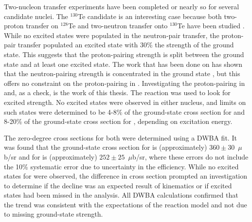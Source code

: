 Two-nucleon transfer experiments have been completed or nearly so for several candidate nuclei.  The $^{130}$Te candidate is an interesting case because both two-proton transfer on $^{128}$Te and two-neutron transfer onto $^{130}$Te have been studied \cite{protonPairsTellurium,neutronPairsTellurium}.  While no excited \zp states were populated in the neutron-pair transfer, the proton-pair transfer populated an excited \zp state with 30\% the strength of the ground state.  This suggests that the proton-pairing strength is split between the ground state and at least one excited \zp state.   The work that has been done on  has shown that the neutron-pairing strength is concentrated in the ground state \cite{neutronPairsGermanium}, but this offers no constraint on the proton-pairing in .  Investigating the proton-pairing in  and, as a check,  is the work of this thesis.  The reaction \reaction was used to look for excited \zp strength.  No excited \zp states were observed in either nucleus, and limits on such states were determined to be 4-8\% of the ground-state cross section for  and 8-20\% of the ground-state cross section for , depending on excitation energy.  

The zero-degree cross sections for both \GeTargets were determined using a DWBA fit.  It was found that the ground-state cross section for  is (approximately) $360\pm30$~$\mu$b/sr and for  is (approximately) $252\pm25$~$\mu$b/sr, where these errors do not include the 10\% systematic error due to uncertainty in the efficiency.  While no excited states for  were observed, the difference in cross section prompted an investigation to determine if the decline was an expected result of kinematics or if excited \zp states had been missed in the analysis.  All DWBA calculations confirmed that the trend was consistent with the expectations of the reaction model and not due to missing ground-state \zp strength. 



